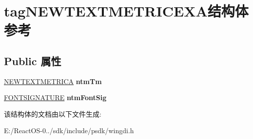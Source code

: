 \hypertarget{structtag_n_e_w_t_e_x_t_m_e_t_r_i_c_e_x_a}{}\section{tag\+N\+E\+W\+T\+E\+X\+T\+M\+E\+T\+R\+I\+C\+E\+X\+A结构体 参考}
\label{structtag_n_e_w_t_e_x_t_m_e_t_r_i_c_e_x_a}
\subsection*{Public 属性}
\begin{DoxyCompactItemize}
\item 
\mbox{\label{structtag_n_e_w_t_e_x_t_m_e_t_r_i_c_e_x_a_a2ca7bd84cd58b4959c4acc13f4187806}} 
\hyperlink{structtag_n_e_w_t_e_x_t_m_e_t_r_i_c_a}{N\+E\+W\+T\+E\+X\+T\+M\+E\+T\+R\+I\+CA} {\bfseries ntm\+Tm}
\item 
\mbox{\label{structtag_n_e_w_t_e_x_t_m_e_t_r_i_c_e_x_a_a969d3be62e01cdf81957f99b661c727b}} 
\hyperlink{structtag_f_o_n_t_s_i_g_n_a_t_u_r_e}{F\+O\+N\+T\+S\+I\+G\+N\+A\+T\+U\+RE} {\bfseries ntm\+Font\+Sig}
\end{DoxyCompactItemize}


该结构体的文档由以下文件生成\+:\begin{DoxyCompactItemize}
\item 
E\+:/\+React\+O\+S-\/0../sdk/include/psdk/wingdi.\+h\end{DoxyCompactItemize}
